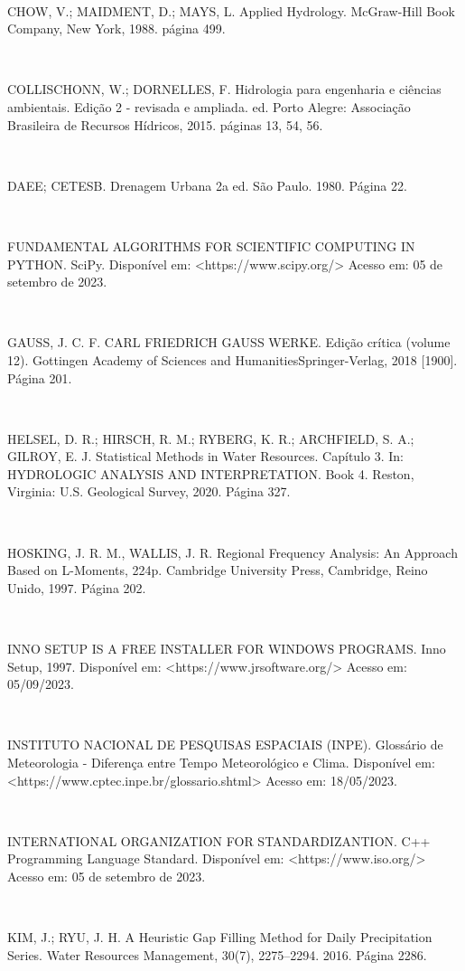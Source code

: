 \begin{flushleft}
\

CHOW, V.; MAIDMENT, D.; MAYS, L. Applied Hydrology. McGraw-Hill Book Company, New York, 1988. página 499.

\

COLLISCHONN, W.; DORNELLES, F. Hidrologia para engenharia e ciências ambientais. Edição 2 - revisada e ampliada. ed. Porto Alegre: Associação Brasileira de Recursos Hídricos, 2015. páginas 13, 54, 56.

\

DAEE; CETESB. Drenagem Urbana 2a ed. São Paulo. 1980. Página 22.

\

FUNDAMENTAL ALGORITHMS FOR SCIENTIFIC COMPUTING IN PYTHON. SciPy. Disponível em: <https://www.scipy.org/> Acesso em: 05 de setembro de 2023.

\newpage

\

GAUSS, J. C. F. CARL FRIEDRICH GAUSS WERKE. Edição crítica (volume 12). Gottingen Academy of Sciences and HumanitiesSpringer-Verlag, 2018 [1900]. Página 201.

\

HELSEL, D. R.; HIRSCH, R. M.; RYBERG, K. R.; ARCHFIELD, S. A.; GILROY, E. J. Statistical Methods in Water Resources. Capítulo 3. In: HYDROLOGIC ANALYSIS AND INTERPRETATION. Book 4. Reston, Virginia: U.S. Geological Survey, 2020. Página 327.

\

HOSKING, J. R. M., WALLIS, J. R. Regional Frequency Analysis: An Approach Based on L-Moments, 224p. Cambridge University Press, Cambridge, Reino Unido, 1997. Página 202.

\

INNO SETUP IS A FREE INSTALLER FOR WINDOWS PROGRAMS. Inno Setup, 1997. Disponível em: <https://www.jrsoftware.org/> Acesso em: 05/09/2023.

\

INSTITUTO NACIONAL DE PESQUISAS ESPACIAIS (INPE). Glossário de Meteorologia - Diferença entre Tempo Meteorológico e Clima. Disponível em: <https://www.cptec.inpe.br/glossario.shtml> Acesso em: 18/05/2023.

\

INTERNATIONAL ORGANIZATION FOR STANDARDIZANTION. C++ Programming Language Standard. Disponível em: <https://www.iso.org/> Acesso em: 05 de setembro de 2023.

\

KIM, J.; RYU, J. H. A Heuristic Gap Filling Method for Daily Precipitation Series. Water Resources Management, 30(7), 2275–2294. 2016. Página 2286.


\end{flushleft}
